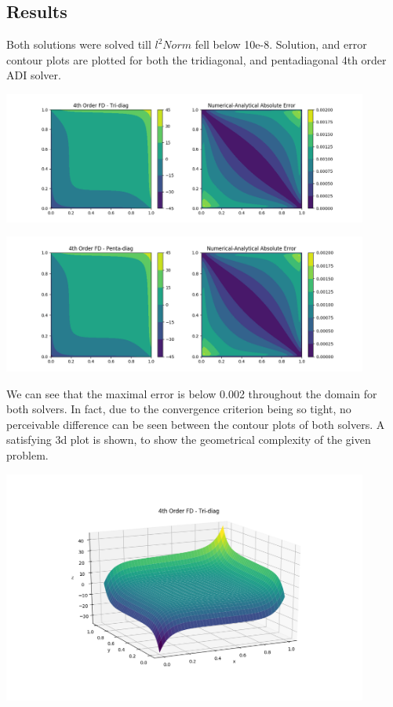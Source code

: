 \documentclass[11pt]{article}
\begin{document}
\subsection{Results}
\label{sec-1-5}
Both solutions were solved till $l^{2}Norm$ fell below 10e-8.
Solution, and error contour plots are plotted for both the tridiagonal, and pentadiagonal 4th order ADI solver.

\includegraphics[width=12cm]{./figures/tridiag.png}

\includegraphics[width=12cm]{./figures/penta.png}

We can see that the maximal error is below 0.002 throughout the domain for both solvers. In fact, due to the convergence criterion being so tight, no perceivable difference can be seen between the contour plots of both solvers.
A satisfying 3d plot is shown, to show the geometrical complexity of the given problem.

\includegraphics[width=12cm]{./figures/3d.png}
\end{document}
